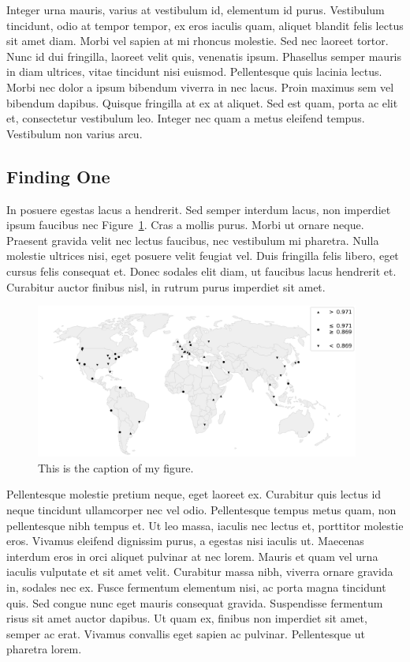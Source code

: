 \documentclass[12pt,letterpaper]{article} %
\begin{document}
Integer urna mauris, varius at vestibulum id, elementum id purus. Vestibulum tincidunt, odio at tempor tempor, ex eros iaculis quam, aliquet blandit felis lectus sit amet diam. Morbi vel sapien at mi rhoncus molestie. Sed nec laoreet tortor. Nunc id dui fringilla, laoreet velit quis, venenatis ipsum. Phasellus semper mauris in diam ultrices, vitae tincidunt nisi euismod. Pellentesque quis lacinia lectus. Morbi nec dolor a ipsum bibendum viverra in nec lacus. Proin maximus sem vel bibendum dapibus. Quisque fringilla at ex at aliquet. Sed est quam, porta ac elit et, consectetur vestibulum leo. Integer nec quam a metus eleifend tempus. Vestibulum non varius arcu.

\subsection{Finding One}

 In posuere egestas lacus a hendrerit. Sed semper interdum lacus, non imperdiet ipsum faucibus nec Figure~\ref{fig:my_figure}. Cras a mollis purus. Morbi ut ornare neque. Praesent gravida velit nec lectus faucibus, nec vestibulum mi pharetra. Nulla molestie ultrices nisi, eget posuere velit feugiat vel. Duis fringilla felis libero, eget cursus felis consequat et. Donec sodales elit diam, ut faucibus lacus hendrerit et. Curabitur auctor finibus nisl, in rutrum purus imperdiet sit amet.

\begin{figure}[tbp]
    \centering
    \includegraphics[width=0.95\textwidth]{example.png}
    \caption{This is the caption of my figure.}\label{fig:my_figure}
\end{figure}

Pellentesque molestie pretium neque, eget laoreet ex. Curabitur quis lectus id neque tincidunt ullamcorper nec vel odio. Pellentesque tempus metus quam, non pellentesque nibh tempus et. Ut leo massa, iaculis nec lectus et, porttitor molestie eros. Vivamus eleifend dignissim purus, a egestas nisi iaculis ut. Maecenas interdum eros in orci aliquet pulvinar at nec lorem. Mauris et quam vel urna iaculis vulputate et sit amet velit. Curabitur massa nibh, viverra ornare gravida in, sodales nec ex. Fusce fermentum elementum nisi, ac porta magna tincidunt quis. Sed congue nunc eget mauris consequat gravida. Suspendisse fermentum risus sit amet auctor dapibus. Ut quam ex, finibus non imperdiet sit amet, semper ac erat. Vivamus convallis eget sapien ac pulvinar. Pellentesque ut pharetra lorem.
\end{document}
